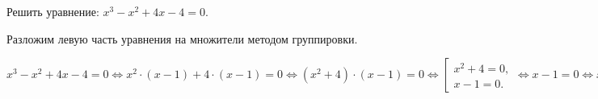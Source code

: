  Решить уравнение: $x^3-x^2+4x-4=0$.

\Solution Разложим левую часть уравнения на множители методом группировки.
\begin{center}
$x^3-x^2+4x-4=0 \Leftrightarrow x^2\cdot (x-1)+4\cdot (x-1)=0 \Leftrightarrow (x^2+4)\cdot (x-1)=0 \Leftrightarrow \left[
\begin{array}{l}
x^2+4=0,\\
x-1=0.
\end{array}
\right.\Leftrightarrow x-1=0 \Leftrightarrow x=1.$
\end{center}
